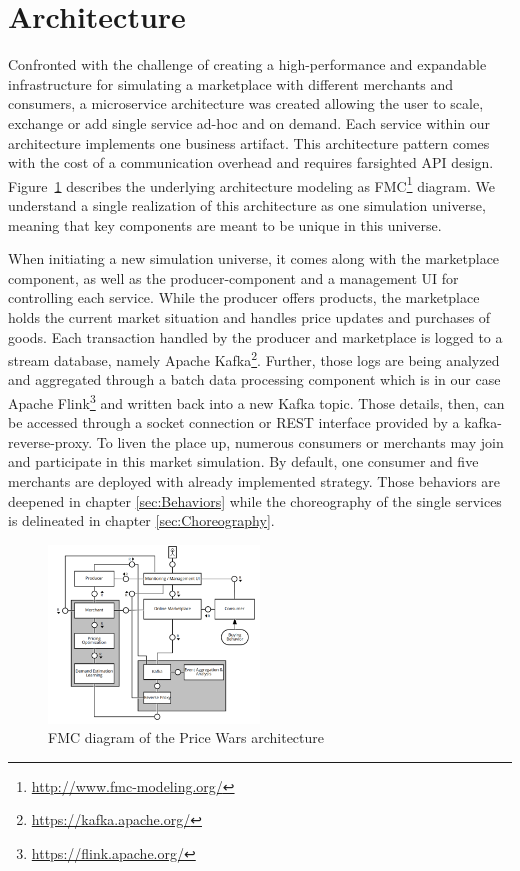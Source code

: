 \section{Architecture}
\label{sec:Architecture}
%
Confronted with the challenge of creating a high-performance and expandable infrastructure for simulating a marketplace with different merchants and consumers, a microservice architecture was created allowing the user to scale, exchange or add single service ad-hoc and on demand. Each service within our architecture implements one business artifact. This architecture pattern comes with the cost of a communication overhead and requires farsighted API design.\\

Figure~\ref{fig:fmc} describes the underlying architecture modeling as FMC\footnote{\url{http://www.fmc-modeling.org/}} diagram. We understand a single realization of this architecture as one simulation universe, meaning that key components are meant to be unique in this universe. 

When initiating a new simulation universe, it comes along with the marketplace component, as well as the producer-component and a management UI for controlling each service. While the producer offers products, the marketplace holds the current market situation and handles price updates and purchases of goods. Each transaction handled by the producer and marketplace is logged to a stream database, namely Apache Kafka\footnote{\url{https://kafka.apache.org/}}. Further, those logs are being analyzed and aggregated through a batch data processing component which is in our case Apache Flink\footnote{\url{https://flink.apache.org/}} and written back into a new Kafka topic. Those details, then, can be accessed through a socket connection or REST interface provided by a kafka-reverse-proxy. 
To liven the place up, numerous consumers or merchants may join and participate in this market simulation. By default, one consumer and five merchants are deployed with already implemented strategy. Those behaviors are deepened in chapter \ref{sec:Behaviors} while the choreography of the single services is delineated in chapter \ref{sec:Choreography}.

%
\begin{figure}[h]
    \centering
    \includegraphics[width=0.5\textwidth]{images/architecture_fmc.png}
    \caption{FMC diagram of the Price Wars architecture}
    \label{fig:fmc}
\end{figure}
%